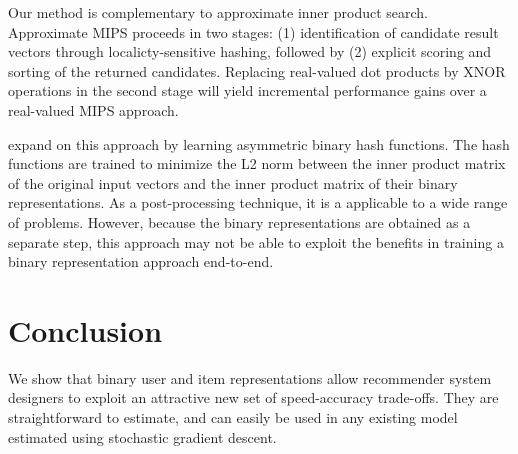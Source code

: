\documentclass[sigchi]{acmart}
\begin{document}
Our method is complementary to approximate inner product search. Approximate MIPS proceeds in two stages: (1) identification of candidate result vectors through localicty-sensitive hashing, followed by (2) explicit scoring and sorting of the returned candidates. Replacing real-valued dot products by XNOR operations in the second stage will yield incremental performance gains over a real-valued MIPS approach.

\citet{Shen_2015_ICCV} expand on this approach by learning asymmetric binary hash functions. The hash functions are trained to minimize the L2 norm between the inner product matrix of the original input vectors and the inner product matrix of their binary representations. As a post-processing technique, it is a applicable to a wide range of problems. However, because the binary representations are obtained as a separate step, this approach may not be able to exploit the benefits in training a binary representation approach end-to-end.

\section{Conclusion}
We show that binary user and item representations allow recommender system designers to exploit an attractive new set of speed-accuracy trade-offs. They are straightforward to estimate, and can easily be used in any existing model estimated using stochastic gradient descent.




\end{document}

